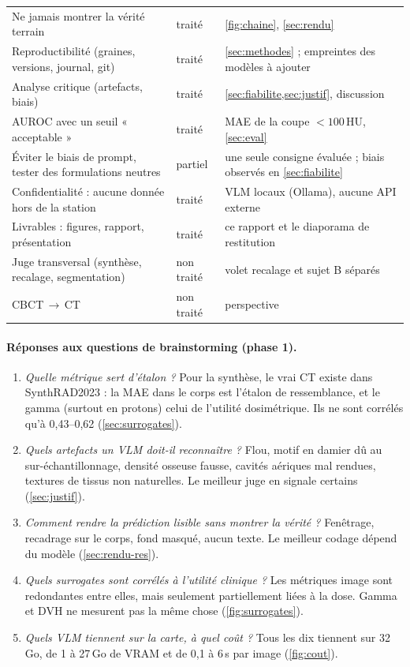 \documentclass[11pt,a4paper]{article}
\begin{document}
\begin{table}[H]
\begin{tabular}{>{\raggedright\arraybackslash}p{5.6cm}>{\raggedright\arraybackslash}p{1.5cm}>{\raggedright\arraybackslash}p{7.7cm}}
Ne jamais montrer la vérité terrain & traité & \cref{fig:chaine}, \cref{sec:rendu} \\
Reproductibilité (graines, versions, journal, git) & traité & \cref{sec:methodes} ; empreintes des modèles à ajouter \\
Analyse critique (artefacts, biais) & traité & \cref{sec:fiabilite,sec:justif}, discussion \\
AUROC avec un seuil « acceptable » & traité & MAE de la coupe $< 100$\,HU, \cref{sec:eval} \\
Éviter le biais de prompt, tester des formulations neutres & partiel & une seule consigne évaluée ; biais observés en \cref{sec:fiabilite} \\
Confidentialité : aucune donnée hors de la station & traité & VLM locaux (Ollama), aucune API externe \\
Livrables : figures, rapport, présentation & traité & ce rapport et le diaporama de restitution \\
Juge transversal (synthèse, recalage, segmentation) & non traité & volet recalage et sujet B séparés \\
CBCT\,$\rightarrow$\,CT & non traité & perspective \\
\bottomrule
\end{tabular}
\end{table}

\paragraph{Réponses aux questions de brainstorming (phase 1).}
\begin{enumerate}
  \item \emph{Quelle métrique sert d'étalon ?} Pour la synthèse, le vrai CT existe dans SynthRAD2023 : la MAE dans le corps est l'étalon de ressemblance, et le gamma (surtout en protons) celui de l'utilité dosimétrique. Ils ne sont corrélés qu'à 0,43--0,62 (\cref{sec:surrogates}).
  \item \emph{Quels artefacts un VLM doit-il reconnaître ?} Flou, motif en damier dû au sur-échantillonnage, densité osseuse fausse, cavités aériques mal rendues, textures de tissus non naturelles. Le meilleur juge en signale certains (\cref{sec:justif}).
  \item \emph{Comment rendre la prédiction lisible sans montrer la vérité ?} Fenêtrage, recadrage sur le corps, fond masqué, aucun texte. Le meilleur codage dépend du modèle (\cref{sec:rendu-res}).
  \item \emph{Quels surrogates sont corrélés à l'utilité clinique ?} Les métriques image sont redondantes entre elles, mais seulement partiellement liées à la dose. Gamma et DVH ne mesurent pas la même chose (\cref{fig:surrogates}).
  \item \emph{Quels VLM tiennent sur la carte, à quel coût ?} Tous les dix tiennent sur 32\,Go, de 1 à 27\,Go de VRAM et de 0,1 à 6\,s par image (\cref{fig:cout}).
\end{enumerate}
\end{document}
